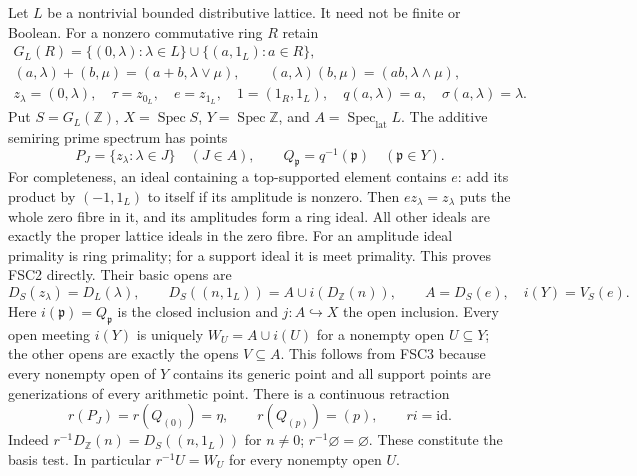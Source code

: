 \documentclass[11pt,a4paper]{article}
\theoremstyle{definition}\newtheorem{definition}[theorem]{Definition}
\begin{document}
Let $L$ be a nontrivial bounded distributive lattice. It need not be
finite or Boolean. For a nonzero commutative ring $R$ retain
\begin{equation}\tag{FSC1}
 \begin{gathered}
 G_L(R)=\{(0,\lambda):\lambda\in L\}
                  \cup\{(a,1_L):a\in R\},\\
 (a,\lambda)+(b,\mu)=(a+b,\lambda\vee\mu),\qquad
 (a,\lambda)(b,\mu)=(ab,\lambda\wedge\mu),\\
 z_\lambda=(0,\lambda),\quad\tau=z_{0_L},\quad e=z_{1_L},
 \quad 1=(1_R,1_L),\quad q(a,\lambda)=a,\quad
 \sigma(a,\lambda)=\lambda.
 \end{gathered}
\end{equation}
Put $S=G_L(\mathbb Z)$, $X=\operatorname{Spec}S$,
$Y=\operatorname{Spec}\mathbb Z$, and
$A=\operatorname{Spec}_{\mathrm{lat}}L$. The additive semiring prime
spectrum has points
\begin{equation}\tag{FSC2}
 P_J=\{z_\lambda:\lambda\in J\}\quad(J\in A),\qquad
 Q_{\mathfrak p}=q^{-1}(\mathfrak p)\quad(\mathfrak p\in Y).
\end{equation}
For completeness, an ideal containing a top-supported element contains
$e$: add its product by $(-1,1_L)$ to itself if its amplitude is nonzero.
Then $ez_\lambda=z_\lambda$ puts the whole zero fibre in it, and its
amplitudes form a ring ideal. All other ideals are exactly the proper
lattice ideals in the zero fibre. For an amplitude ideal primality is
ring primality; for a support ideal it is meet primality. This proves
FSC2 directly. Their basic opens are
\begin{equation}\tag{FSC3}
 D_S(z_\lambda)=D_L(\lambda),\qquad
 D_S((n,1_L))=A\cup i(D_{\mathbb Z}(n)),\qquad
 A=D_S(e),\quad i(Y)=V_S(e).
\end{equation}
Here $i(\mathfrak p)=Q_{\mathfrak p}$ is the closed inclusion and
$j:A\hookrightarrow X$ the open inclusion. Every open meeting $i(Y)$
is uniquely $W_U=A\cup i(U)$ for a nonempty open $U\subseteq Y$;
the other opens are exactly the opens $V\subseteq A$. This follows
from FSC3 because every nonempty open of $Y$ contains its generic
point and all support points are generizations of every arithmetic
point. There is a continuous retraction
\begin{equation}\tag{FSC4}
 r(P_J)=r(Q_{(0)})=\eta,\qquad r(Q_{(p)})=(p),\qquad ri=\mathrm{id}.
\end{equation}
Indeed $r^{-1}D_{\mathbb Z}(n)=D_S((n,1_L))$ for $n\ne0$;
$r^{-1}\varnothing=\varnothing$. These constitute the basis test.
In particular $r^{-1}U=W_U$ for every nonempty open $U$.
\end{document}
